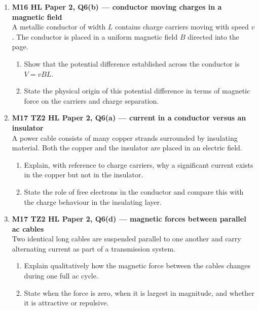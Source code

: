 \documentclass[11pt]{article}
\begin{document}
\begin{enumerate}[leftmargin=*, itemsep=1.2em]

\item \textbf{M16 HL Paper 2, Q6(b) --- conductor moving charges in a magnetic field}\\
A metallic conductor of width $L$ contains charge carriers moving with speed $v$. The conductor is placed in a uniform magnetic field $B$ directed into the page.
\begin{enumerate}[label=(\alph*)]
\item Show that the potential difference established across the conductor is $V=vBL$.
\item State the physical origin of this potential difference in terms of magnetic force on the carriers and charge separation.
\end{enumerate}

\item \textbf{M17 TZ2 HL Paper 2, Q6(a) --- current in a conductor versus an insulator}\\
A power cable consists of many copper strands surrounded by insulating material. Both the copper and the insulator are placed in an electric field.
\begin{enumerate}[label=(\alph*)]
\item Explain, with reference to charge carriers, why a significant current exists in the copper but not in the insulator.
\item State the role of free electrons in the conductor and compare this with the charge behaviour in the insulating layer.
\end{enumerate}

\item \textbf{M17 TZ2 HL Paper 2, Q6(d) --- magnetic forces between parallel ac cables}\\
Two identical long cables are suspended parallel to one another and carry alternating current as part of a transmission system.
\begin{enumerate}[label=(\alph*)]
\item Explain qualitatively how the magnetic force between the cables changes during one full ac cycle.
\item State when the force is zero, when it is largest in magnitude, and whether it is attractive or repulsive.
\end{enumerate}


\end{enumerate}
\end{document}
